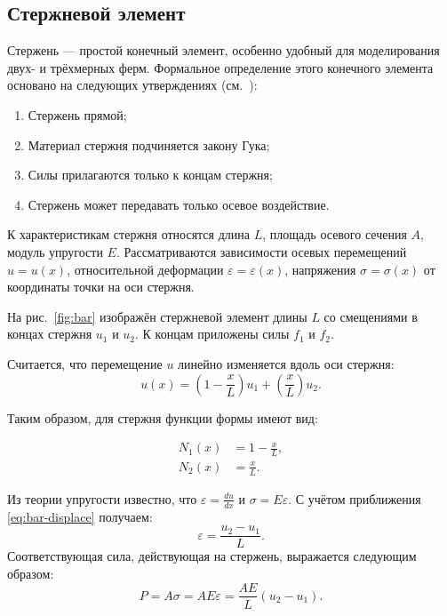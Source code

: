 \documentclass[10pt]{article}
\numberwithin{equation}{section}
\renewcommand{\epsilon}{\varepsilon}
\newcommand{\figref}[1]{рис. \ref{#1}}
\begin{document}
\subsection{Стержневой элемент}

Стержень — простой конечный элемент, особенно удобный для
моделирования двух- и трёхмерных ферм. Формальное определение этого
конечного элемента основано на следующих утверждениях
(см. \cite{hutton04}):

\begin{enumerate}
\item Стержень прямой;

\item Материал стержня подчиняется закону Гука;

\item Силы прилагаются только к концам стержня;

\item Стержень может передавать только осевое воздействие.
\end{enumerate}

К характеристикам стержня относятся длина $L$, площадь осевого
сечения $A$, модуль упругости $E$. Рассматриваются зависимости осевых
перемещений $u = u(x)$, относительной деформации $\epsilon =
\epsilon(x)$, напряжения $\sigma = \sigma(x)$ от координаты точки на
оси стержня.



На \figref{fig:bar} изображён стержневой элемент длины $L$ со
смещениями в концах стержня $u_1$ и $u_2$. К концам приложены силы
$f_1$ и $f_2$.

Считается, что перемещение $u$ линейно изменяется вдоль оси стержня:
\begin{equation}
  \label{eq:bar-displace}
  u(x) = \left( 1 - \frac{x}{L} \right) u_1 + \left( \frac{x}{L}
  \right) u_2.
\end{equation}

Таким образом, для стержня функции формы имеют вид:

\begin{equation}
  \label{eq:bar-shape}
  \begin{aligned}
    N_1(x) &= 1 - \frac{x}{L},\\
    N_2(x) &= \frac{x}{L}.
  \end{aligned}
\end{equation}

Из теории упругости известно, что $\epsilon = \frac{du}{dx}$ и $\sigma
= E\epsilon$. С учётом приближения \eqref{eq:bar-displace} получаем:
\begin{equation}
  \label{eq:bar-strain}
  \epsilon = \frac{u_2-u_1}{L}.
\end{equation}
Соответствующая сила, действующая на стержень, выражается следующим
образом:
\begin{equation*}
  P = A\sigma = AE\epsilon = \frac{AE}{L}(u_2-u_1).
\end{equation*}
\end{document}
